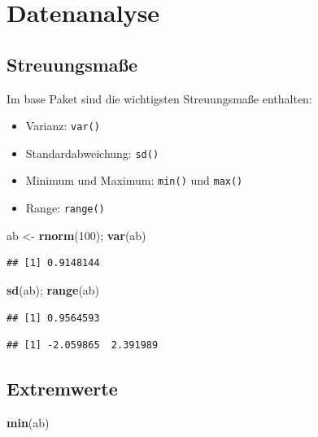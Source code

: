 \documentclass[]{article}
\newenvironment{Shaded}{\begin{snugshade}}{\end{snugshade}}
\newcommand{\KeywordTok}[1]{\textcolor[rgb]{0.13,0.29,0.53}{\textbf{{#1}}}}
\newcommand{\DecValTok}[1]{\textcolor[rgb]{0.00,0.00,0.81}{{#1}}}
\newcommand{\StringTok}[1]{\textcolor[rgb]{0.31,0.60,0.02}{{#1}}}
\newcommand{\NormalTok}[1]{{#1}}
\providecommand{\tightlist}{%
  \setlength{\itemsep}{0pt}\setlength{\parskip}{0pt}}
\begin{document}
\section{Datenanalyse}\label{datenanalyse}

\subsection{Streuungsmaße}\label{streuungsmae}

Im base Paket sind die wichtigsten Streuungsmaße enthalten:

\begin{itemize}
\tightlist
\item
  Varianz: \texttt{var()}
\item
  Standardabweichung: \texttt{sd()}
\item
  Minimum und Maximum: \texttt{min()} und \texttt{max()}
\item
  Range: \texttt{range()}
\end{itemize}

\begin{Shaded}
\begin{Highlighting}[]
\NormalTok{ab <-}\StringTok{ }\KeywordTok{rnorm}\NormalTok{(}\DecValTok{100}\NormalTok{); }\KeywordTok{var}\NormalTok{(ab)}
\end{Highlighting}
\end{Shaded}

\begin{verbatim}
## [1] 0.9148144
\end{verbatim}

\begin{Shaded}
\begin{Highlighting}[]
\KeywordTok{sd}\NormalTok{(ab); }\KeywordTok{range}\NormalTok{(ab)}
\end{Highlighting}
\end{Shaded}

\begin{verbatim}
## [1] 0.9564593
\end{verbatim}

\begin{verbatim}
## [1] -2.059865  2.391989
\end{verbatim}

\subsection{Extremwerte}\label{extremwerte}

\begin{Shaded}
\begin{Highlighting}[]
\KeywordTok{min}\NormalTok{(ab)}
\end{Highlighting}
\end{Shaded}
\end{document}
